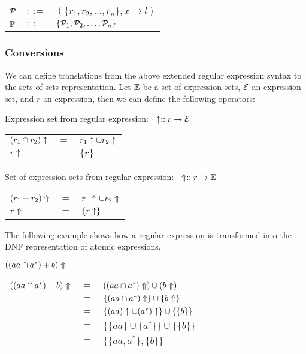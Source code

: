\begin{tabular}{lll}
   $\mathcal{P}$	& $::=$ & $(\{r_1, r_2, \dots, r_n\}, x \to l)$ \\
   $\mathbb{P}$	& $::=$ & $\{\mathcal{P}_1, \mathcal{P}_2, \dots, \mathcal{P}_n\}$ \\
\end{tabular}


\subsubsection{Conversions}

We can define translations from the above extended regular expression syntax
to the sets of sets representation. Let $\mathbb{E}$ be a set of expression
sets, $\mathcal{E}$ an expression set, and $r$ an expression, then we can
define the following operators:

Expression set from regular expression: $\cdot\uparrow :: r \to \mathcal{E}$

\begin{tabular}{lll}
   $(r_1 \cap r_2)\uparrow$	& $=$	& $r_1\uparrow \cup r_2\uparrow$	\\
   $r\uparrow$			& $=$	& $\{r\}$				\\
\end{tabular}

Set of expression sets from regular expression: $\cdot\Uparrow :: r \to \mathbb{E}$

\begin{tabular}{lll}
   $(r_1 + r_2)\Uparrow$	& $=$	& $r_1\Uparrow \cup r_2\Uparrow$	\\
   $r\Uparrow$		& $=$	& $\{r\uparrow\}$			\\
\end{tabular}

The following example shows how a regular expression is transformed into the
DNF representation of atomic expressions.

\begin{eg}
   $((aa \cap a^*) + b)\Uparrow$

   \begin{tabular}{lll}
      $((aa \cap a^*) + b)\Uparrow$
      & $=$	& $((aa \cap a^*)\Uparrow) \cup (b\Uparrow)$		\\
      & $=$	& $\{(aa \cap a^*)\uparrow\} \cup \{b\Uparrow\}$		\\
      & $=$	& $\{(aa)\uparrow \cup (a^*)\uparrow\} \cup \{\{b\}\}$	\\
      & $=$	& $\{\{aa\} \cup \{a^*\}\} \cup \{\{b\}\}$			\\
      & $=$	& $\{\{aa, a^*\}, \{b\}\}$					\\
   \end{tabular}
\end{eg}

